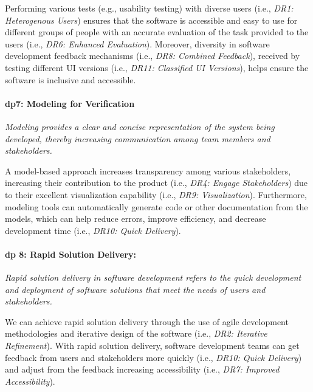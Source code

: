 Performing various tests (e.g., usability testing) with diverse users (i.e., \textit{DR1: Heterogenous Users}) ensures that the software is accessible and easy to use for different groups of people with an accurate evaluation of the task provided to the users (i.e., \textit{DR6: Enhanced Evaluation}).
Moreover, diversity in software development feedback mechanisms (i.e., \textit{DR8: Combined Feedback}), received by testing different UI versions (i.e., \textit{DR11: Classified UI Versions}), helps ensure the software is inclusive and accessible.

\paragraph{\ac{dp}7: Modeling for Verification} \textit{Modeling provides a clear and concise representation of the system being developed, thereby increasing communication among team members and stakeholders.}

A model-based approach increases transparency among various stakeholders, increasing their contribution to the product (i.e., \textit{DR4: Engage Stakeholders}) due to their excellent visualization capability (i.e., \textit{DR9: Visualization}).
Furthermore, modeling tools can automatically generate code or other documentation from the models, which can help reduce errors, improve efficiency, and decrease development time (i.e., \textit{DR10: Quick Delivery}).

\paragraph{\ac{dp} 8: Rapid Solution Delivery:} \textit{Rapid solution delivery in software development refers to the quick development and deployment of software solutions that meet the needs of users and stakeholders.}

We can achieve rapid solution delivery through the use of agile development methodologies and iterative design of the software (i.e., \textit{DR2: Iterative Refinement}).
With rapid solution delivery, software development teams can get feedback from users and stakeholders more quickly (i.e., \textit{DR10: Quick Delivery}) and adjust from the feedback increasing accessibility (i.e., \textit{DR7: Improved Accessibility}).

\clearpage

